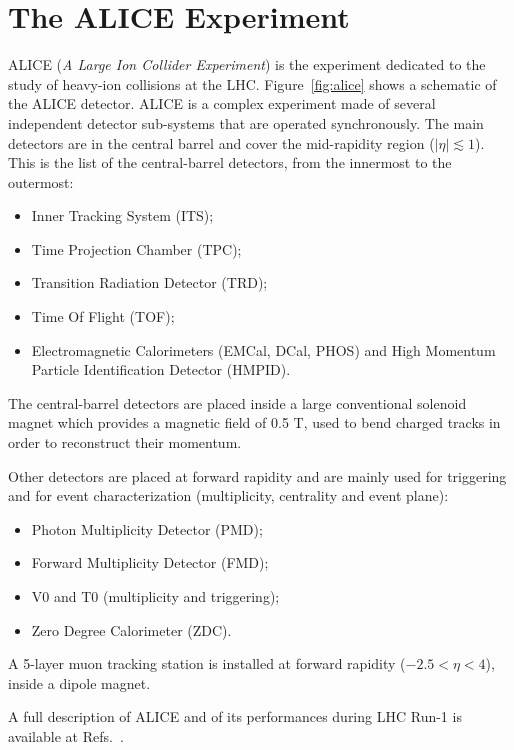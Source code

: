 \documentclass[12pt, a4paper, twoside, titlepage]{article}
\begin{document}
\section{The ALICE Experiment}
ALICE (\emph{A Large Ion Collider Experiment}) is the experiment dedicated to the study of heavy-ion collisions at the LHC.
Figure~\ref{fig:alice} shows a schematic of the ALICE detector.
ALICE is a complex experiment made of several independent detector sub-systems that are operated synchronously.
The main detectors are in the central barrel and cover the mid-rapidity region ($\lvert \eta\rvert \lesssim 1$).
This is the list of the central-barrel detectors, from the innermost to the outermost:
\begin{itemize}
\item Inner Tracking System (ITS);
\item Time Projection Chamber (TPC);
\item Transition Radiation Detector (TRD);
\item Time Of Flight (TOF);
\item Electromagnetic Calorimeters (EMCal, DCal, PHOS) and High Momentum Particle Identification Detector (HMPID).
\end{itemize}
The central-barrel detectors are placed inside a large conventional solenoid magnet which provides a magnetic field of 0.5 T,
used to bend charged tracks in order to reconstruct their momentum.

Other detectors are placed at forward rapidity and are mainly used for triggering and for event characterization 
(multiplicity, centrality and event plane):
\begin{itemize}
\item Photon Multiplicity Detector (PMD);
\item Forward Multiplicity Detector (FMD);
\item V0 and T0 (multiplicity and triggering);
\item Zero Degree Calorimeter (ZDC).
\end{itemize}
A 5-layer muon tracking station is installed at forward rapidity ($-2.5 < \eta < 4$), inside a dipole magnet.

A full description of ALICE and of its performances during LHC Run-1 is available at Refs.~\cite{}.\
\end{document}
